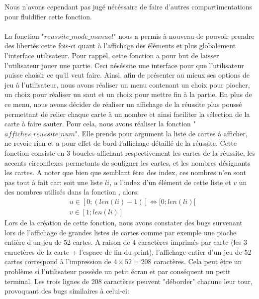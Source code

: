 \documentclass[10pt,a4paper,french,titlepage]{article}
\begin{document}
Nous n'avons cependant pas jugé nécéssaire de faire d'autres compartimentations pour fluidifier cette fonction.\\\\
	\tabto{1cm}La fonction "$reussite\_mode\_manuel$" nous a permis à nouveau de pouvoir prendre des libertés cette fois-ci quant à l'affichage des éléments et
plus globalement l'interface utilisateur. Pour rappel, cette fonction a pour but de laisser l'utilisateur jouer une partie. Ceci néséssite une interface
pour que l'utilisateur puisse choisir ce qu'il veut faire. Ainsi, afin de présenter au mieux ses options de jeu à l'utilisateur, nous avons réaliser un
menu contenant un choix pour piocher, un choix pour réaliser un saut et un choix pour mettre fin à la partie. En plus de ce menu, nous avons décider de
réaliser un affichage de la réussite plus poussé permettant de relier chaque carte à un nombre et ainsi faciliter la sélection de la carte à faire
sauter. Pour cela, nous avons réaliser la fonction "$affiches\_reussite\_num$". Elle prends pour argument la liste de cartes à afficher, ne revoie rien et a
pour effet de bord l'affichage détaillé de la réussite. Cette fonction consiste en 3 boucles affichant respectivement les cartes de la réussite, les
accents circonflexes permetants de souligner les cartes, et les nombres désignants les cartes. A noter que bien que semblant être des index, ces nombres
n'en sont pas tout à fait car: soit une liste $li$, $u$ l'index d'un élément de cette liste et $v$ un des nombres utilisés dans la fonction , alors:
\begin{align*}
	&u \in [0;(len(li)-1)] \iff [0;len(li)[\\
	&v \in [1;len(li)]
\end{align*}
Lors de la création de cette fonction, nous avons constater des bugs survenant lors de l'affichage de grandes listes de cartes comme par exemple une pioche entière d'un jeu de 52 cartes. A raison de 4 caractères imprimés par carte (les 3 caractères de la carte + l'espace de fin du print), l'affichage entier d'un jeu de 52 cartes correspond à l'impression de $4\times52=208$ caractères. Cela peut être un problème si l'utilisateur possède un petit écran et par conséquent un petit terminal. Les trois lignes de 208 caractères peuvent "déborder" chacune leur tour, provoquant des bugs similaires à  celui-ci:\\\\
\end{document}
